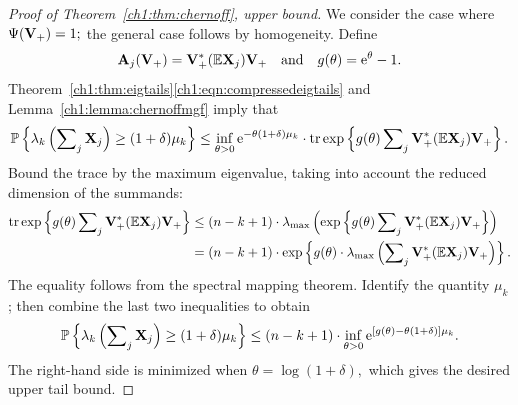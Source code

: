 \begin{proof}[Proof of Theorem~\ref{ch1:thm:chernoff}, upper bound]
We consider the case where $\Psi(\mathbf{V}_{+}) = 1;$ the general case follows
by homogeneity.
Define 
$$ \mathbf{A}_j(\mathbf{V}_{+}) = \mathbf{V}_{+}^* (\mathbb{E} \mathbf{X}_j) \mathbf{V}_{+} \quad
\text{and}\quad  g(\theta) = \mathrm{e}^\theta - 1. $$
Theorem~\ref{ch1:thm:eigtails}\eqref{ch1:eqn:compressedeigtails} and 
Lemma~\ref{ch1:lemma:chernoffmgf} imply that 
\[
\mathbb{P}\left\{\lambda_k\left(\sum\nolimits_j \mathbf{X}_j\right) \geq (1+\delta)\mu_k\right\} \leq
\inf_{\theta > 0} \mathrm{e}^{-\theta (1 + \delta)\mu_k} \cdot \operatorname{tr}\mathrm{exp} \left\{g(\theta)
\sum\nolimits_j\mathbf{V}_{+}^* (\mathbb{E} \mathbf{X}_j) \mathbf{V}_{+} \right\}. 
\]
Bound the trace by the maximum eigenvalue, taking into account the reduced
dimension of the summands:
\begin{align*}
\operatorname{tr}\mathrm{exp} \left\{g(\theta) \sum\nolimits_j \mathbf{V}_{+}^*(\mathbb{E}
\mathbf{X}_j)\mathbf{V}_{+}\right\} & \leq (n-k+1)\cdot 
\lambda_{\mathrm{max}}\left(\mathrm{exp}\left\{g(\theta) \sum\nolimits_j \mathbf{V}_{+}^*(\mathbb{E}
\mathbf{X}_j)\mathbf{V}_{+}\right\}\right) \\
 & = (n-k+1) \cdot \mathrm{exp}\left\{g(\theta) \cdot
\lambda_{\mathrm{max}}\left(\sum\nolimits_j\mathbf{V}_{+}^*(\mathbb{E}\mathbf{X}_j)\mathbf{V}_{+}\right)\right\}.
\end{align*}
The equality follows from the spectral mapping theorem. Identify the quantity
$\mu_k$; then combine the last two inequalities to obtain
\[
 \mathbb{P}\left\{\lambda_k\left(\sum\nolimits_j \mathbf{X}_j \right) \geq (1 + \delta)\mu_k\right\}
\leq \\
(n-k+1) \cdot \inf_{\theta >0 } \mathrm{e}^{[g(\theta) -\theta(1 + \delta)] \mu_k }. 
\]
The right-hand side is minimized when $\theta = \log(1+\delta),$ which gives the
desired upper tail bound.
\end{proof}


